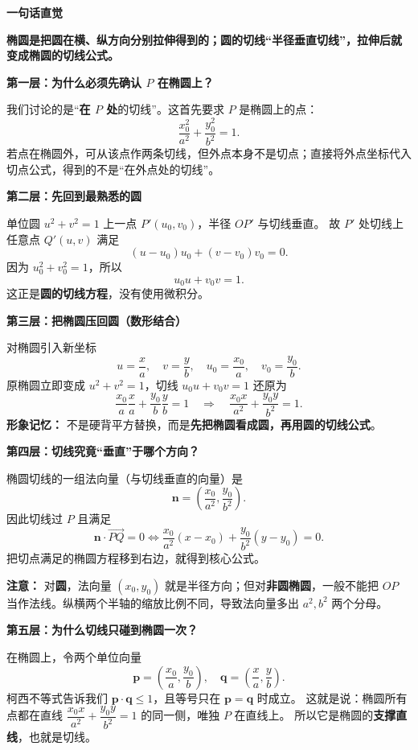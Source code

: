 \begin{explanationbox}
\textbf{\textcolor{CExplanation}{一句话直觉}}

\textbf{椭圆是把圆在横、纵方向分别拉伸得到的；圆的切线“半径垂直切线”，拉伸后就变成椭圆的切线公式。}

\medskip
\textbf{\textcolor{CExplanation}{第一层：为什么必须先确认 $P$ 在椭圆上？}}

我们讨论的是“\textbf{在 $P$ 处}的切线”。这首先要求 $P$ 是椭圆上的点：
\[
\frac{x_0^2}{a^2}+\frac{y_0^2}{b^2}=1.
\]
若点在椭圆外，可从该点作两条切线，但外点本身不是切点；直接将外点坐标代入切点公式，得到的不是“在外点处的切线”。

\medskip
\textbf{\textcolor{CExplanation}{第二层：先回到最熟悉的圆}}

单位圆 $u^2+v^2=1$ 上一点 $P'(u_0,v_0)$，半径 $OP'$ 与切线垂直。
故 $P'$ 处切线上任意点 $Q'(u,v)$ 满足
\[
(u-u_0)u_0+(v-v_0)v_0=0.
\]
因为 $u_0^2+v_0^2=1$，所以
\[
\boxed{u_0u+v_0v=1.}
\]
这正是\textbf{圆的切线方程}，没有使用微积分。

\medskip
\textbf{\textcolor{CExplanation}{第三层：把椭圆压回圆（数形结合）}}

对椭圆引入新坐标
\[
u=\frac{x}{a},\quad v=\frac{y}{b},\quad
u_0=\frac{x_0}{a},\quad v_0=\frac{y_0}{b}.
\]
原椭圆立即变成 $u^2+v^2=1$，切线 $u_0u+v_0v=1$ 还原为
\[
\frac{x_0}{a}\frac{x}{a}+\frac{y_0}{b}\frac{y}{b}=1
\quad\Longrightarrow\quad
\boxed{\frac{x_0x}{a^2}+\frac{y_0y}{b^2}=1.}
\]
\textbf{形象记忆：} 不是硬背平方替换，而是\textbf{先把椭圆看成圆，再用圆的切线公式}。

\medskip
\textbf{\textcolor{CExplanation}{第四层：切线究竟“垂直”于哪个方向？}}

椭圆切线的一组法向量（与切线垂直的向量）是
\[
\boldsymbol n=\left(\frac{x_0}{a^2},\frac{y_0}{b^2}\right).
\]
因此切线过 $P$ 且满足
\[
\boldsymbol n\cdot\overrightarrow{PQ}=0
\iff
\frac{x_0}{a^2}(x-x_0)+\frac{y_0}{b^2}(y-y_0)=0.
\]
把切点满足的椭圆方程移到右边，就得到核心公式。

\textbf{注意：} 对\textbf{圆}，法向量 $(x_0,y_0)$ 就是半径方向；但对\textbf{非圆椭圆}，一般不能把 $OP$ 当作法线。纵横两个半轴的缩放比例不同，导致法向量多出 $a^2,b^2$ 两个分母。

\medskip
\textbf{\textcolor{CExplanation}{第五层：为什么切线只碰到椭圆一次？}}

在椭圆上，令两个单位向量
\[
\boldsymbol p=\left(\frac{x_0}{a},\frac{y_0}{b}\right),\quad
\boldsymbol q=\left(\frac{x}{a},\frac{y}{b}\right).
\]
柯西不等式告诉我们 $\boldsymbol p\cdot\boldsymbol q\le1$，且等号只在 $\boldsymbol p=\boldsymbol q$ 时成立。
这就是说：椭圆所有点都在直线
$\dfrac{x_0x}{a^2}+\dfrac{y_0y}{b^2}=1$ 的同一侧，唯独 $P$ 在直线上。
所以它是椭圆的\textbf{支撑直线}，也就是切线。


\end{explanationbox}
